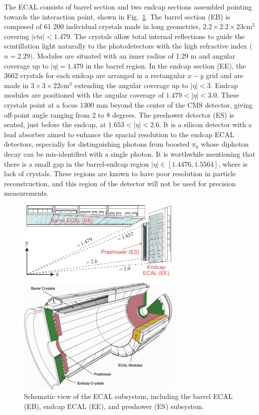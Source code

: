 The ECAL consists of barrel section and two endcap sections assembled pointing towards the interaction point, shown in Fig.~\ref{fig:cms_ecal}.
The barrel section (EB) is composed of 61 200 individual crystals made in long geometries, $2.2\times 2.2\times 23 \mathrm{cm}^3$ covering $|eta|<1.479$.
The crystals allow total internal reflections to guide the scintillation light naturally to the photodetectors with the high refractive index ($n=2.29)$.
Modules are situated with an inner radius of 1.29 m and angular coverage up to $|\eta|=1.479$ in the barrel region.
In the endcap section (EE), the 3662 crystals for each endcap are arranged in a rectangular $x-y$ grid and are made in $3\times 3\times 22\mathrm{cm}^3$ extending the angular coverage up to $|\eta|<3$.
Endcap modules are positioned with the angular coverage of $1.479 < |\eta| < 3.0$. 
These crystals point at a focus 1300 mm beyond the center of the CMS detector, giving off-point angle ranging from 2 to 8 degrees.
The preshower detector (ES) is seated, just before the endcap, at $1.653 < |\eta| < 2.6$.
It is a silicon detector with a lead absorber aimed to enhance the spacial resolution to the endcap ECAL detectors, especially for distinguishing photons from boosted $\pi_0$ whose diphoton decay can be mis-identified with a single photon.
It is worthwhile mentioning that there is a small gap in the barrel-endcap region $|\eta| \in [1.4476, 1.5564]$, where is lack of crystals.
These regions are known to have poor resolution in particle reconstruction, and this region of the detector will not be used for precision measurements.
\begin{figure}[H]\centering
    \includegraphics[width=0.7\textwidth]{figure/cms_ecal.png}
    \caption[Schematic view of the ECAL subsystem.]
    {Schematic view of the ECAL subsystem, including the barrel ECAL (EB), endcap ECAL (EE), and preshower (ES) subsystem.}
    \label{fig:cms_ecal}
\end{figure}

